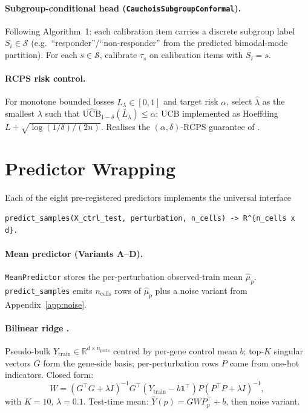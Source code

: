 \documentclass{article}
\begin{document}
\paragraph{Subgroup-conditional head (\texttt{CauchoisSubgroupConformal}).} Following \citet{cauchois2021} Algorithm~1: each calibration item carries a discrete subgroup label $S_i \in \mathcal{S}$ (e.g.\ ``responder''/``non-responder'' from the predicted bimodal-mode partition). For each $s \in \mathcal{S}$, calibrate $\hat{\tau}_s$ on calibration items with $S_i = s$.

\paragraph{RCPS risk control.} For monotone bounded losses $L_\lambda \in [0, 1]$ and target risk $\alpha$, select $\hat{\lambda}$ as the smallest $\lambda$ such that $\widehat{\mathrm{UCB}}_{1-\delta}(\bar{L}_\lambda) \leq \alpha$; UCB implemented as Hoeffding $\bar{L} + \sqrt{\log(1/\delta)/(2n)}$. Realises the $(\alpha, \delta)$-RCPS guarantee of \citet{bates2021}.

\section{Predictor Wrapping}
\label{app:predictors}

Each of the eight pre-registered predictors implements the universal interface
\begin{verbatim}
predict_samples(X_ctrl_test, perturbation, n_cells) -> R^{n_cells x d}.
\end{verbatim}

\paragraph{Mean predictor (Variants A--D).} \texttt{MeanPredictor} stores the per-perturbation observed-train mean $\hat{\mu}_p$. \texttt{predict\_samples} emits $n_{\text{cells}}$ rows of $\hat{\mu}_p$ plus a noise variant from Appendix~\ref{app:noise}.

\paragraph{Bilinear ridge \citep{ahlmann2025}.} Pseudo-bulk $Y_{\text{train}} \in \mathbb{R}^{d \times n_{\text{perts}}}$ centred by per-gene control mean $b$; top-$K$ singular vectors $G$ form the gene-side basis; per-perturbation rows $P$ come from one-hot indicators. Closed form:
\begin{equation*}
W = (G^\top G + \lambda I)^{-1} G^\top (Y_{\text{train}} - b\mathbf{1}^\top) P (P^\top P + \lambda I)^{-1},
\end{equation*}
with $K = 10$, $\lambda = 0.1$. Test-time mean: $\hat{Y}(p) = G W P_p^\top + b$, then noise variant.
\end{document}
